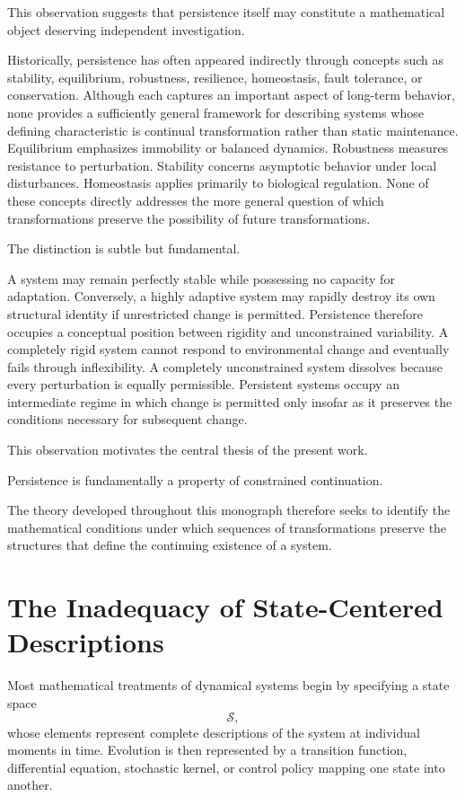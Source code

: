 \documentclass[11pt]{book}
\numberwithin{equation}{chapter}
\theoremstyle{definition}
\theoremstyle{plain}
\begin{document}
This observation suggests that persistence itself may constitute a mathematical object deserving independent investigation.

Historically, persistence has often appeared indirectly through concepts such as stability, equilibrium, robustness, resilience, homeostasis, fault tolerance, or conservation. Although each captures an important aspect of long-term behavior, none provides a sufficiently general framework for describing systems whose defining characteristic is continual transformation rather than static maintenance. Equilibrium emphasizes immobility or balanced dynamics. Robustness measures resistance to perturbation. Stability concerns asymptotic behavior under local disturbances. Homeostasis applies primarily to biological regulation. None of these concepts directly addresses the more general question of which transformations preserve the possibility of future transformations.

The distinction is subtle but fundamental.

A system may remain perfectly stable while possessing no capacity for adaptation. Conversely, a highly adaptive system may rapidly destroy its own structural identity if unrestricted change is permitted. Persistence therefore occupies a conceptual position between rigidity and unconstrained variability. A completely rigid system cannot respond to environmental change and eventually fails through inflexibility. A completely unconstrained system dissolves because every perturbation is equally permissible. Persistent systems occupy an intermediate regime in which change is permitted only insofar as it preserves the conditions necessary for subsequent change.

This observation motivates the central thesis of the present work.

Persistence is fundamentally a property of constrained continuation.

The theory developed throughout this monograph therefore seeks to identify the mathematical conditions under which sequences of transformations preserve the structures that define the continuing existence of a system.

\section{The Inadequacy of State-Centered Descriptions}

Most mathematical treatments of dynamical systems begin by specifying a state space
\[
\mathcal{S},
\]
whose elements represent complete descriptions of the system at individual moments in time. Evolution is then represented by a transition function, differential equation, stochastic kernel, or control policy mapping one state into another.
\end{document}

